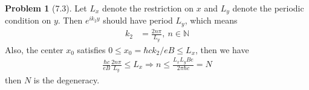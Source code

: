 \documentclass[twoside,11pt]{article}
\newcommand{\NN}{\mathbb{N}}
\theoremstyle{definition}
\newtheorem{problem}{Problem}
\theoremstyle{remark}
\begin{document}
\begin{problem}[7.3]
Let $L_x$ denote the restriction on $x$ 
and $L_y$ denote the periodic condition on $y$.
Then $e^{ik_2y}$ should have period $L_y$, which means
\begin{align*}
    k_2 &= \frac{2n\pi}{L_y},\ n\in\NN
\end{align*}
Also, the center $x_0$ satisfies $0 \leq x_0=\hbar ck_2/eB\leq L_x$, then we have
\begin{align*}
    \frac{\hbar c}{eB}\frac{2n\pi}{L_y} \leq L_x
    \Rightarrow
    n \leq \frac{L_xL_yBe}{2\pi\hbar c} = N
\end{align*}
then $N$ is the degeneracy.





\end{problem}







\end{document}
